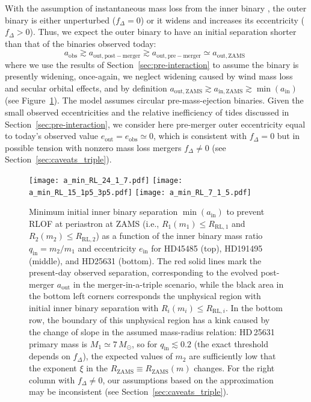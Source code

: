 \documentclass{aa}
\DeclareRobustCommand{\Figref}[1]{Figure~\ref{#1}}
\DeclareRobustCommand{\Secref}[1]{Section~\ref{#1}}
\begin{document}
With the assumption of instantaneous mass loss from the inner binary
\citep{blaauw:61}, the outer binary is either unperturbed
($f_\Delta=0$) or it widens and increases its eccentricity
($f_\Delta>0$). Thus, we expect the outer binary to have an initial
separation shorter than that of the binaries observed today:
\begin{equation}
  \label{eq:sep_ordering}
  a_\mathrm{obs} \gtrsim a_\mathrm{out,post-merger}\gtrsim
  a_\mathrm{out, pre-merger}\simeq a_\mathrm{out, ZAMS} \ \,
\end{equation}
where we use the results of \Secref{sec:pre-interaction} to assume the binary is presently widening, once-again, we neglect widening caused by wind mass loss and
secular orbital effects, and by definition
$a_\mathrm{out,ZAMS} \gtrsim a_\mathrm{in, ZAMS} \gtrsim \min(a_\mathrm{in})$
(see \Figref{fig:min_a_in}). The \cite{blaauw:61} model assumes
circular pre-mass-ejection binaries. Given the small observed
eccentricities and the relative inefficiency of tides discussed in
\Secref{sec:pre-interaction}, we consider here pre-merger outer
eccentricity equal to today's observed value
$e_\mathrm{out}=e_\mathrm{obs}\simeq0$, which is consistent with
$f_\Delta=0$ but in possible tension with nonzero mass loss mergers
$f_\Delta\neq0$ (see \Secref{sec:caveats_triple}).


\begin{figure}[hbtp]
  \centering
  \texttt{[image: a\_min\_RL\_24\_1\_7.pdf]}
  \texttt{[image: a\_min\_RL\_15\_1p5\_3p5.pdf]}
  \texttt{[image: a\_min\_RL\_7\_1\_5.pdf]}
  \caption{Minimum initial inner binary separation
    $\min(a_\mathrm{in})$ to prevent RLOF at periastron at ZAMS (i.e., $R_1(m_1) \leq R_\mathrm{RL,1}$ and
    $R_2(m_2)\leq R_\mathrm{RL,2}$) as a function of the inner binary
    mass ratio $q_\mathrm{in}=m_2/m_1$ and eccentricity
    $e_\mathrm{in}$ for HD45485 (top), HD191495 (middle), and HD25631
    (bottom). The red solid lines mark the present-day observed
    separation, corresponding to the evolved post-merger
    $a_\mathrm{out}$ in the merger-in-a-triple scenario, while the
    black area in the bottom left corners corresponds the unphysical
    region with initial inner binary separation with $R_i(m_i) \leq R_{\mathrm{RL},i}$. In the bottom row, the
    boundary of this unphysical region has a kink caused by the change
    of slope in the assumed mass-radius relation: HD\,25631 primary
    mass is $M_{1}\simeq 7\,M_\odot$, so for
    $q_\mathrm{in}\lesssim 0.2$ (the exact threshold depends on
    $f_\Delta$), the expected values of $m_2$ are sufficiently low
    that the exponent $\xi$ in the
    $R_\mathrm{ZAMS}\equiv R_\mathrm{ZAMS}(m)$ changes. For the right
    column with $f_\Delta\neq0$, our assumptions based on the
    \cite{blaauw:61} approximation may be inconsistent (see \Secref{sec:caveats_triple}).}
  \label{fig:min_a_in}
\end{figure}
\end{document}
